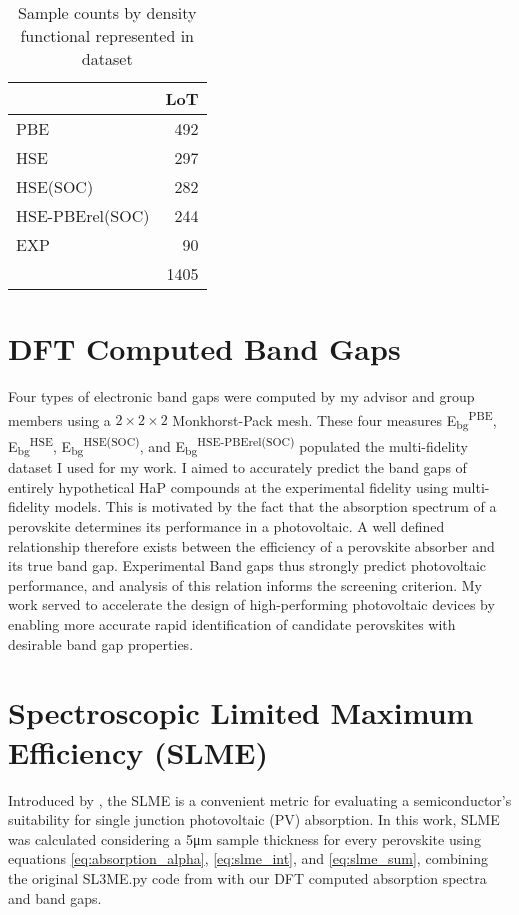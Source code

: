  
\begin{table}[htbp]
\caption{\label{tbl:LoTs} Sample counts by density functional represented in dataset}
\centering
\begin{tabular}{lr}
 & LoT\\[0pt]
\hline
PBE & 492\\[0pt]
HSE & 297\\[0pt]
HSE(SOC) & 282\\[0pt]
HSE-PBErel(SOC) & 244\\[0pt]
EXP & 90\\[0pt]
\hline
 & 1405\\[0pt]
\end{tabular}
\end{table}

\section{DFT Computed Band Gaps}
\label{sec:org388cac4}
Four types of electronic band gaps were computed by my advisor and group members using a \(2\times{}2\times{}2\) Monkhorst-Pack mesh.
These four measures E\textsubscript{bg}\textsuperscript{PBE}, E\textsubscript{bg}\textsuperscript{HSE}, E\textsubscript{bg}\textsuperscript{HSE(SOC)}, and E\textsubscript{bg}\textsuperscript{HSE-PBErel(SOC)} populated the multi-fidelity dataset I used for my work.
I aimed to accurately predict the band gaps of entirely hypothetical HaP compounds at the experimental fidelity using multi-fidelity models. 
This is motivated by the fact that the absorption spectrum of a perovskite determines its performance in a photovoltaic.
\autocite{mannodi-kanakkithodi-2019-compr-comput}
A well defined relationship therefore exists between the efficiency of a perovskite absorber and its true band gap.
\autocite{yu-2012-ident-poten}
Experimental Band gaps thus strongly predict photovoltaic performance, and analysis of this relation informs the screening criterion.
My work served to accelerate the design of high-performing photovoltaic devices by enabling more accurate rapid identification of candidate perovskites with desirable band gap properties.

\section{Spectroscopic Limited Maximum Efficiency (SLME)}
\label{sec:org6a8940d}
Introduced by \textcite{yu-2012-ident-poten}, the SLME is a convenient metric for evaluating a semiconductor's suitability for single junction photovoltaic (PV) absorption.
In this work, SLME was calculated considering a 5\unit{\micro\meter} sample thickness for every perovskite using equations \ref{eq:absorption_alpha}, \ref{eq:slme_int}, and \ref{eq:slme_sum}, combining the original SL3ME.py code from \textcite{yu-2012-ident-poten} with our DFT computed absorption spectra and band gaps.

